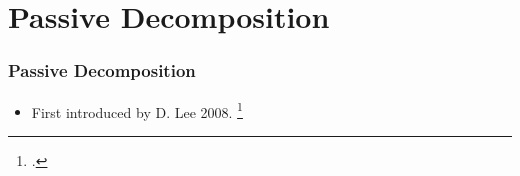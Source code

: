 \section{Passive Decomposition}

\begin{frame}
	\frametitle{Passive Decomposition}
	
	\begin{itemize}
		\item First introduced by D. Lee 2008. \footcite{LeePassive}
	\end{itemize}
\end{frame}